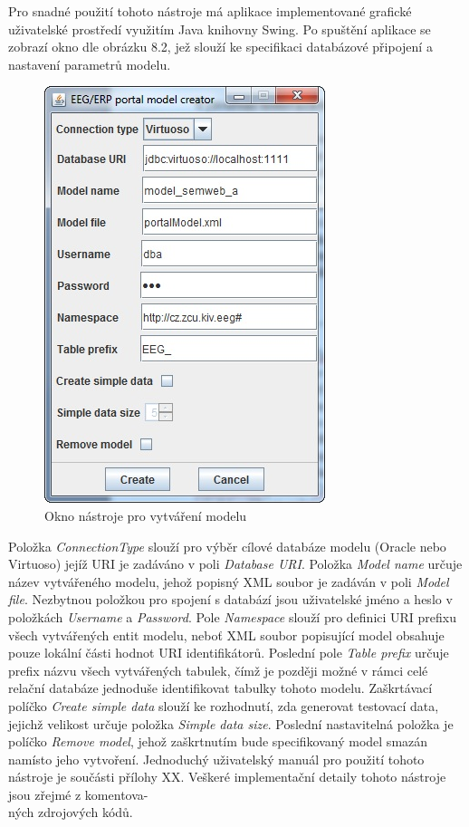 \documentclass{projekt}
\begin{document}
Pro snadné použití tohoto nástroje má aplikace implementované grafické uživatelské prostředí využitím Java knihovny Swing. Po spuštění aplikace se zobrazí okno dle obrázku 8.2, jež slouží ke specifikaci databázové připojení a nastavení parametrů modelu.


\begin{figure}[htb]
\begin{center}
\includegraphics[scale=0.8]{Creator.jpg}
\caption{Okno nástroje pro vytváření modelu}
\end{center}
\end{figure}

Položka {\it ConnectionType} slouží pro výběr cílové databáze modelu (Oracle nebo Virtuoso) jejíž URI je zadáváno v poli {\it Database URI}. Položka {\it Model name} určuje název vytvářeného modelu, jehož popisný XML soubor je zadáván v poli {\it Model file}. Nezbytnou položkou pro spojení s databází jsou uživatelské jméno a heslo v položkách {\it Username} a {\it Password}. Pole {\it Namespace} slouží pro definici URI prefixu všech vytvářených entit modelu, neboť XML soubor popisující model obsahuje pouze lokální části hodnot URI identifikátorů. Poslední pole {\it Table prefix} určuje prefix názvu všech vytvářených tabulek, čímž je později možné v rámci celé relační databáze jednoduše identifikovat tabulky tohoto modelu. 
Zaškrtávací políčko {\it Create simple data} slouží ke rozhodnutí, zda generovat testovací data, jejichž velikost určuje položka {\it Simple data size}. Poslední nastavitelná položka je políčko {\it Remove model}, jehož zaškrtnutím bude specifikovaný model smazán namísto jeho vytvoření.
Jednoduchý uživatelský manuál pro použití tohoto nástroje je součásti přílohy XX. Veškeré implementační detaily tohoto nástroje jsou zřejmé z komentova-\\ných zdrojových kódů.
\end{document}
